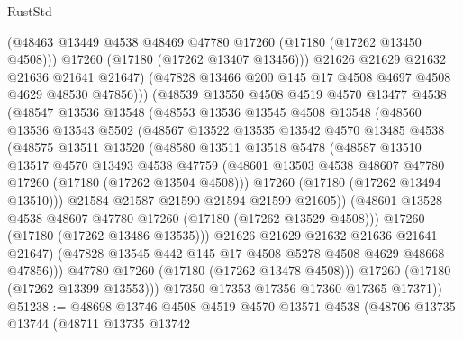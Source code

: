 \begin{lexlean}{RustStd}
\begin{coremodule}
{\begin{coremodule}
{{{{{{{{{{{{{{{{{{{{{{{{{{{{{{{{{{{{{{{{{{{{{{{{{{{{{{{                  (@48463 @13449 @4538 @48469 @47780 @17260 (@17180 (@17262 @13450 @4508)))
                  @17260
                  (@17180 (@17262 @13407 @13456)))
                @21626
                @21629
                @21632
                @21636
                @21641
                @21647)
              (@47828 @13466 @200 @145 @17 @4508 @4697 @4508 @4629 @48530 @47856)))
          (@48539
            @13550
            @4508
            @4519
            @4570
            @13477
            @4538
            (@48547
              @13536
              @13548
              (@48553
                @13536
                @13545
                @4508
                @13548
                (@48560
                  @13536
                  @13543
                  @5502
                  (@48567
                    @13522
                    @13535
                    @13542
                    @4570
                    @13485
                    @4538
                    (@48575
                      @13511
                      @13520
                      (@48580
                        @13511
                        @13518
                        @5478
                        (@48587
                          @13510
                          @13517
                          @4570
                          @13493
                          @4538
                          @47759
                          (@48601 @13503 @4538 @48607 @47780 @17260 (@17180 (@17262 @13504 @4508)))
                          @17260
                          (@17180 (@17262 @13494 @13510)))
                        @21584
                        @21587
                        @21590
                        @21594
                        @21599
                        @21605))
                    (@48601 @13528 @4538 @48607 @47780 @17260 (@17180 (@17262 @13529 @4508)))
                    @17260
                    (@17180 (@17262 @13486 @13535)))
                  @21626
                  @21629
                  @21632
                  @21636
                  @21641
                  @21647)
                (@47828 @13545 @442 @145 @17 @4508 @5278 @4508 @4629 @48668 @47856)))
            @47780
            @17260
            (@17180 (@17262 @13478 @4508)))
          @17260
          (@17180 (@17262 @13399 @13553)))
        @17350
        @17353
        @17356
        @17360
        @17365
        @17371))
@51238 := @48698
    @13746
    @4508
    @4519
    @4570
    @13571
    @4538
    (@48706
      @13735
      @13744
      (@48711
        @13735
        @13742
}}}}}}}}}}}}}}}}}}}}}}}}}}}}}}}}}}}}}}}}}}}}}}}}}}}}}}}
\end{coremodule}}
\end{coremodule}
\end{lexlean}
